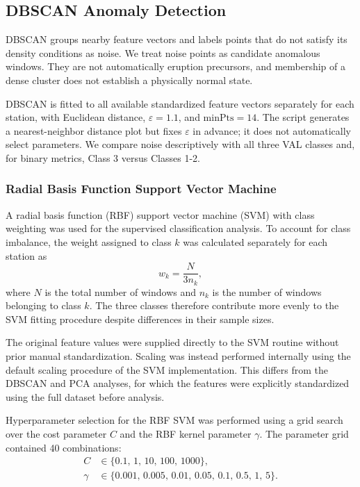 \documentclass[11pt,a4paper]{article}
\begin{document}
	
\subsection{DBSCAN Anomaly Detection}
DBSCAN groups nearby feature vectors and labels points that do not satisfy its density conditions as noise. We treat noise points as candidate anomalous windows. They are not automatically eruption precursors, and membership of a dense cluster does not establish a physically normal state.
	
DBSCAN is fitted to all available standardized feature vectors separately for each station, with Euclidean distance, $\varepsilon=1.1$, and $\mathrm{minPts}=14$. The script generates a nearest-neighbor distance plot but fixes $\varepsilon$ in advance; it does not automatically select parameters. We compare noise descriptively with all three VAL classes and, for binary metrics, Class 3 versus Classes 1-2.
	
\subsubsection{Radial Basis Function Support Vector Machine}

A radial basis function (RBF) support vector machine (SVM) with class weighting was used for the supervised classification analysis. To account for class imbalance, the weight assigned to class \(k\) was calculated separately for each station as
\begin{equation}
	w_k = \frac{N}{3n_k},
\end{equation}
where \(N\) is the total number of windows and \(n_k\) is the number of windows belonging to class \(k\). The three classes therefore contribute more evenly to the SVM fitting procedure despite differences in their sample sizes.

The original feature values were supplied directly to the SVM routine without prior manual standardization. Scaling was instead performed internally using the default scaling procedure of the SVM implementation. This differs from the DBSCAN and PCA analyses, for which the features were explicitly standardized using the full dataset before analysis.

Hyperparameter selection for the RBF SVM was performed using a grid search over the cost parameter \(C\) and the RBF kernel parameter \(\gamma\). The parameter grid contained 40 combinations:
\begin{align*}
	C &\in \{0.1,\,1,\,10,\,100,\,1000\},\\
	\gamma &\in \{0.001,\,0.005,\,0.01,\,0.05,\,0.1,\,0.5,\,1,\,5\}.
\end{align*}
\end{document}
